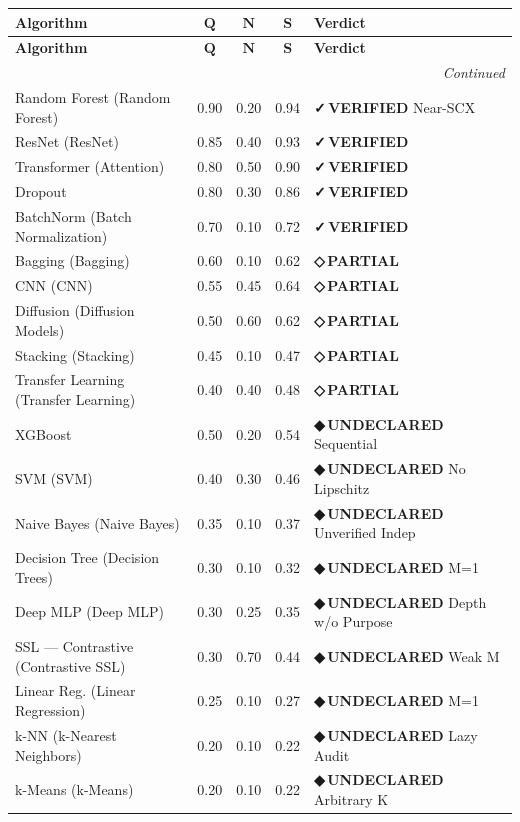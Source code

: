 \documentclass[12pt,a4paper]{article}
\theoremstyle{definition}
\newcommand{\guilty}{{\color{guiltycolor}\textbf{◆\,UNDECLARED}}}
\newcommand{\weakness}{{\color{weakcolor}\textbf{◇\,PARTIAL}}}
\newcommand{\verified}{{\color{verifiedcolor}\textbf{✓\,VERIFIED}}}
\begin{document}
\begin{longtable}{p{3.8cm} c c c p{2.5cm}}
\toprule
\textbf{Algorithm} & $\boldsymbol{Q}$ & $\boldsymbol{N}$ & $\boldsymbol{S}$ & \textbf{Verdict} \\
\midrule
\endfirsthead
\toprule
\textbf{Algorithm} & $\boldsymbol{Q}$ & $\boldsymbol{N}$ & $\boldsymbol{S}$ & \textbf{Verdict} \\
\midrule
\endhead
\midrule
\multicolumn{5}{r}{\textit{Continued}} \\
\endfoot
\bottomrule
\endlastfoot
Random Forest (Random Forest) & 0.90 & 0.20 & 0.94 & \verified{} Near-SCX \\
ResNet (ResNet) & 0.85 & 0.40 & 0.93 & \verified{} \\
Transformer (Attention) & 0.80 & 0.50 & 0.90 & \verified{} \\
Dropout & 0.80 & 0.30 & 0.86 & \verified{} \\
BatchNorm (Batch Normalization) & 0.70 & 0.10 & 0.72 & \verified{} \\
\midrule
Bagging (Bagging) & 0.60 & 0.10 & 0.62 & \weakness{} \\
CNN (CNN) & 0.55 & 0.45 & 0.64 & \weakness{} \\
Diffusion (Diffusion Models) & 0.50 & 0.60 & 0.62 & \weakness{} \\
Stacking (Stacking) & 0.45 & 0.10 & 0.47 & \weakness{} \\
Transfer Learning (Transfer Learning) & 0.40 & 0.40 & 0.48 & \weakness{} \\
\midrule
XGBoost & 0.50 & 0.20 & 0.54 & \guilty{} Sequential \\
SVM (SVM) & 0.40 & 0.30 & 0.46 & \guilty{} No Lipschitz \\
Naive Bayes (Naive Bayes) & 0.35 & 0.10 & 0.37 & \guilty{} Unverified Indep \\
Decision Tree (Decision Trees) & 0.30 & 0.10 & 0.32 & \guilty{} M=1 \\
Deep MLP (Deep MLP) & 0.30 & 0.25 & 0.35 & \guilty{} Depth w/o Purpose \\
SSL — Contrastive (Contrastive SSL) & 0.30 & 0.70 & 0.44 & \guilty{} Weak M \\
Linear Reg. (Linear Regression) & 0.25 & 0.10 & 0.27 & \guilty{} M=1 \\
k-NN (k-Nearest Neighbors) & 0.20 & 0.10 & 0.22 & \guilty{} Lazy Audit \\
k-Means (k-Means) & 0.20 & 0.10 & 0.22 & \guilty{} Arbitrary K \\

\end{longtable}
\end{document}
